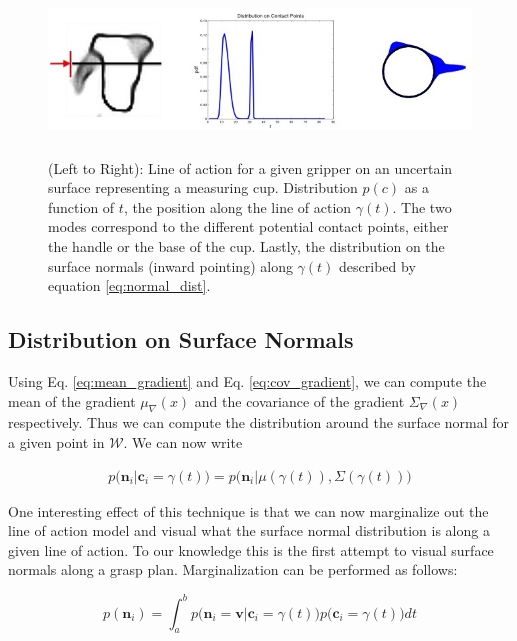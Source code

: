 \documentclass[letterpaper, 10 pt, conference]{ieeeconf}  %
\begin{document}
\begin{figure}[ht!]
\centering
\includegraphics[width = 17cm, height = 4.5cm]{figures/Slide04.jpg}
\caption{ \footnotesize (Left to Right): Line of action for a given gripper on an uncertain surface representing a measuring cup. Distribution $p(c)$ as a function of $t$, the position along the line of action $\gamma(t)$. The two modes correspond to the different potential contact points, either the handle or the base of the cup. Lastly, the distribution on the surface normals (inward pointing) along $\gamma(t)$ described by equation \ref{eq:normal_dist}. }
\vspace*{-10pt}
\label{fig:GraspDist}
\end{figure}



\subsection{Distribution on Surface Normals}\label{sec:normals} 
Using Eq. \ref{eq:mean_gradient} and Eq. \ref{eq:cov_gradient}, we can compute the mean of the gradient $ \mu_{\nabla}(x)$ and the covariance of the gradient $\Sigma_{\nabla}(x)$ respectively. Thus we can compute the distribution around the surface normal for a given point in $\mathcal{W}$. We can now write 

\vspace{-2ex}
\begin{align*}
p\big(\textbf{n}_i|\textbf{c}_i = \gamma(t)\big) = p\big(\textbf{n}_i |\mu(\gamma(t)), \Sigma(\gamma(t)) \big)
\end{align*}

One interesting effect of this technique is that we can now marginalize out the line of action model and visual what the surface normal distribution is along a given line of action. To our knowledge this is the first attempt to visual surface normals along a grasp plan. Marginalization can be performed as follows:

\vspace{-2ex}
\begin{equation}
p(\textbf{n}_i ) = \int_a^b   p\big(\textbf{n}_i = \textbf{v} | \textbf{c}_i = \gamma(t) \big)p\big(\textbf{c}_i = \gamma(t)\big) dt
\end{equation}
\end{document}
